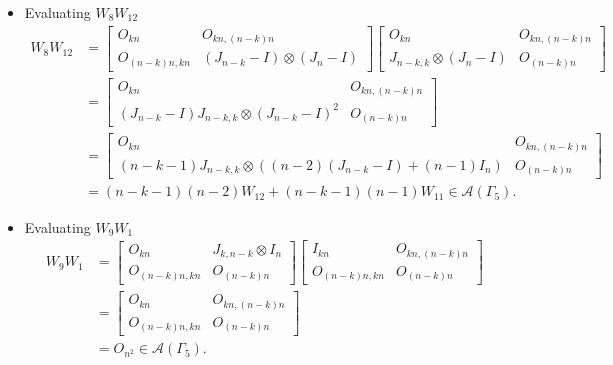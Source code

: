 \begin{itemize}
\item Evaluating $W_{8}W_{12}$
\begin{align*}
    W_8W_{12}
    &= \begin{bmatrix}
        O_{kn} & O_{kn, (n-k)n} \\
        O_{(n-k)n,kn} & (J_{n-k} - I) \otimes (J_n-I)
    \end{bmatrix}
    \begin{bmatrix}
        O_{kn} & O_{kn, (n-k)n} \\
        J_{n-k, k}\otimes (J_n-I) & O_{(n-k)n}
    \end{bmatrix}\\
    &= \begin{bmatrix}
        O_{kn} & O_{kn, (n-k)n} \\
        (J_{n - k} - I)J_{n-k, k}\otimes (J_{n-k} - I)^2 & O_{(n-k)n}
    \end{bmatrix}\\
    &= \begin{bmatrix}
        O_{kn} & O_{kn, (n-k)n} \\
        (n-k-1)J_{n-k, k}\otimes ((n-2)(J_{n-k} - I) + (n-1)I_n) & O_{(n-k)n}
    \end{bmatrix}\\
    &= (n-k-1)(n-2)W_{12} + (n-k-1)(n-1)W_{11}\in\mathcal{A}(\Gamma_5).
\end{align*}

\item Evaluating $W_{9}W_{1}$
\begin{align*}
    W_9W_1
    &= \begin{bmatrix}
        O_{kn} & J_{k,n-k} \otimes I_n \\
        O_{(n-k)n,kn} & O_{(n-k)n}
    \end{bmatrix}
    \begin{bmatrix}
        I_{kn} & O_{kn, (n-k)n} \\
        O_{(n-k)n,kn} & O_{(n-k)n}
    \end{bmatrix}\\
    &= \begin{bmatrix}
        O_{kn} & O_{kn, (n-k)n} \\
        O_{(n-k)n,kn} & O_{(n - k)n}
    \end{bmatrix}\\
    &= O_{n^2} \in\mathcal{A}(\Gamma_5).
\end{align*}


\end{itemize}
